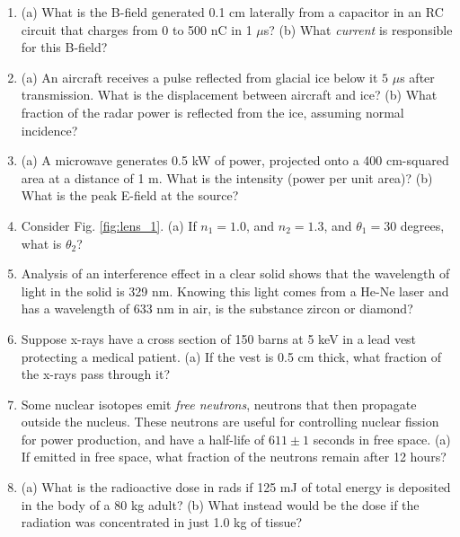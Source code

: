 \documentclass[12pt,twocolumn]{article}
\begin{document}
\noindent
\begin{enumerate}
\item (a) What is the B-field generated 0.1 cm laterally from a capacitor in an RC circuit that charges from 0 to 500 nC in 1 $\mu$s? (b) What \textit{current} is responsible for this B-field? \\ \vspace{2cm}
\item (a) An aircraft receives a pulse reflected from glacial ice below it $5$ $\mu$s after transmission. What is the displacement between aircraft and ice? (b) What fraction of the radar power is reflected from the ice, assuming normal incidence? \\ \vspace{2.5cm}
\item (a) A microwave generates 0.5 kW of power, projected onto a 400 cm-squared area at a distance of 1 m.  What is the intensity (power per unit area)? (b) What is the peak E-field at the source? \\ \vspace{2.5cm}
\item Consider Fig. \ref{fig:lens_1}.  (a) If $n_1 = 1.0$, and $n_2 = 1.3$, and $\theta_1 = 30$ degrees, what is $\theta_2$? \\ \vspace{2cm}
\item Analysis of an interference effect in a clear solid shows that the wavelength of light in the solid is 329 nm. Knowing this light comes from a He-Ne laser and has a wavelength of 633 nm in air, is the substance zircon or diamond?  \\ \vspace{1cm}
\item Suppose x-rays have a cross section of 150 barns at 5 keV in a lead vest protecting a medical patient. (a) If the vest is 0.5 cm thick, what fraction of the x-rays pass through it? \\ \vspace{2cm}
\item Some nuclear isotopes emit \textit{free neutrons}, neutrons that then propagate outside the nucleus.  These neutrons are useful for controlling nuclear fission for power production, and have a half-life of $611\pm 1$ seconds in free space.  (a) If emitted in free space, what fraction of the neutrons remain after 12 hours? \\ \vspace{1cm}
\item (a) What is the radioactive dose in rads if 125 mJ of total energy is deposited in the body of a 80 kg adult? (b) What instead would be the dose if the radiation was concentrated in just 1.0 kg of tissue? \\ \vspace{2cm}
\end{enumerate}
\end{document}
